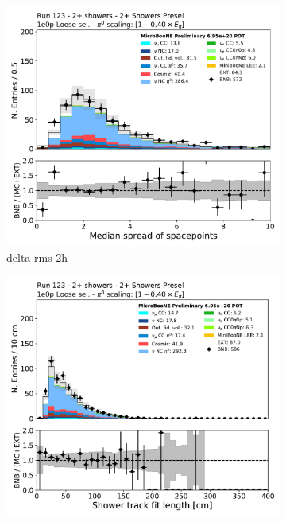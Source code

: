 \begin{figure}[H]
    \centering
    \begin{subfigure}{0.3\textwidth}
    \includegraphics[width=1.0\textwidth]{Sidebands/Figures/TwoShr_1e0pSel/loose/DeltaRMS2h.pdf}
    \caption{delta rms 2h}
    \end{subfigure}
    \begin{subfigure}{0.3\textwidth}
    \includegraphics[width=1.0\textwidth]{Sidebands/Figures/TwoShr_1e0pSel/loose/shr_trk_len.pdf}

\end{subfigure}
\end{figure}
